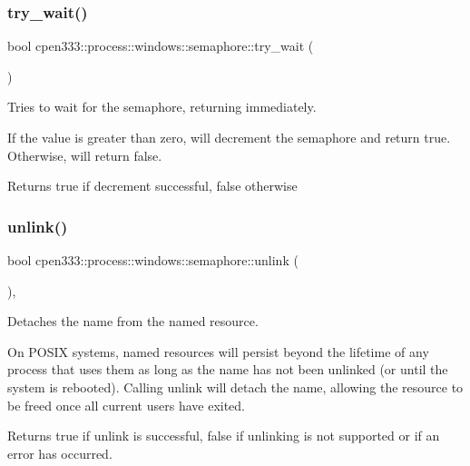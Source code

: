\subsubsection{\texorpdfstring{try\+\_\+wait()}{try\_wait()}}
{\footnotesize\ttfamily bool cpen333\+::process\+::windows\+::semaphore\+::try\+\_\+wait (\begin{DoxyParamCaption}{ }\end{DoxyParamCaption})\hspace{0.3cm}{\ttfamily [inline]}}



Tries to wait for the semaphore, returning immediately. 

If the value is greater than zero, will decrement the semaphore and return true. Otherwise, will return false.

\begin{DoxyReturn}{Returns}
true if decrement successful, false otherwise 
\end{DoxyReturn}
\mbox{\label{classcpen333_1_1process_1_1windows_1_1semaphore_abc5159f32e61024c6c6a978ac64fe39d}} 
\subsubsection{\texorpdfstring{unlink()}{unlink()}\hspace{0.1cm}{\footnotesize\ttfamily [1/2]}}
{\footnotesize\ttfamily bool cpen333\+::process\+::windows\+::semaphore\+::unlink (\begin{DoxyParamCaption}{ }\end{DoxyParamCaption})\hspace{0.3cm}{\ttfamily [inline]}, {\ttfamily [virtual]}}



Detaches the name from the named resource. 

On P\+O\+S\+IX systems, named resources will persist beyond the lifetime of any process that uses them as long as the name has not been unlinked (or until the system is rebooted). Calling {\ttfamily unlink} will detach the name, allowing the resource to be freed once all current users have exited.

\begin{DoxyReturn}{Returns}
{\ttfamily true} if unlink is successful, {\ttfamily false} if unlinking is not supported or if an error has occurred. 
\end{DoxyReturn}


